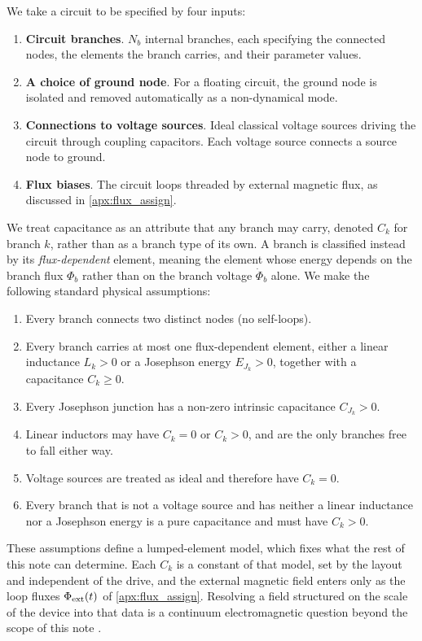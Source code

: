 \documentclass[10pt,aps,pra,onecolumn,superscriptaddress,floatfix,nofootinbib]{revtex4-2}
\begin{document}
We take a circuit to be specified by four inputs:
\begin{enumerate}
    \item {\bf Circuit branches}. $N_b$ internal branches, each specifying the connected nodes, the elements the branch carries, and their parameter values.
    \item {\bf A choice of ground node}. For a floating circuit, the ground node is isolated and removed automatically as a non-dynamical mode.
    \item {\bf Connections to voltage sources}. Ideal classical voltage sources driving the circuit through coupling capacitors. Each voltage source connects a source node to ground.
    \item {\bf Flux biases}. The circuit loops threaded by external magnetic flux, as discussed in \cref{apx:flux_assign}.
\end{enumerate}
We treat capacitance as an attribute that any branch may carry, denoted $C_k$ for branch $k$, rather than as a branch type of its own.
A branch is classified instead by its \emph{flux-dependent} element, meaning the element whose energy depends on the branch flux $\Phi_b$ rather than on the branch voltage $\dot\Phi_b$ alone.
We make the following standard physical assumptions:
\begin{enumerate}
    \item Every branch connects two distinct nodes (no self-loops).
    \item Every branch carries at most one flux-dependent element, either a linear inductance $L_k > 0$ or a Josephson energy $E_{J_k} > 0$, together with a capacitance $C_k \geq 0$.
    \item Every Josephson junction has a non-zero intrinsic capacitance $C_{J_k} > 0$.
    \item Linear inductors may have $C_k = 0$ or $C_k > 0$, and are the only branches free to fall either way.
    \item Voltage sources are treated as ideal and therefore have $C_k = 0$.
    \item Every branch that is not a voltage source and has neither a linear inductance nor a Josephson energy is a pure capacitance and must have $C_k > 0$.
\end{enumerate}
These assumptions define a lumped-element model, which fixes what the rest of this note can determine.
Each $C_k$ is a constant of that model, set by the layout and independent of the drive, and the external magnetic field enters only as the loop fluxes $\Phi_{\rm ext}(t)$ of \cref{apx:flux_assign}.
Resolving a field structured on the scale of the device into that data is a continuum electromagnetic question beyond the scope of this note \cite{RiwarDiVincenzo2022,Rajmohan2022}.
\end{document}
